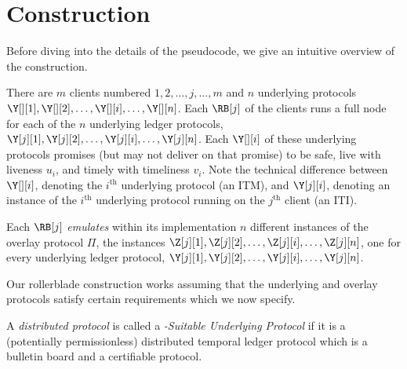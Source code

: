 \section{Construction}\label{sec:construction}

Before diving into the details of the pseudocode, we give an intuitive overview
of the \rollerblade construction.


There are $m$ \rollerblade clients numbered $1, 2,\allowbreak \ldots,\allowbreak j,\allowbreak \ldots,\allowbreak m$
and $n$ underlying protocols $\Y[][1], \Y[][2],\allowbreak \ldots,\allowbreak \Y[][i],\allowbreak \ldots,\allowbreak \Y[][n]$.
Each $\RB[j]$ of the clients runs a full node for each of the $n$ underlying
ledger protocols,
$\Y[j][1], \allowbreak \Y[j][2], \ldots,\allowbreak \Y[j][i],\allowbreak \ldots,\allowbreak \Y[j][n]$.
Each $\Y[][i]$ of these underlying protocols promises (but may not deliver on that promise)
to be safe, live with liveness $u_i$, and timely with timeliness $v_i$.
Note the technical difference between $\Y[][i]$, denoting the $i^\text{th}$ underlying protocol (an ITM),
and $\Y[j][i]$, denoting an instance of the $i^\text{th}$ underlying protocol running on the
$j^\text{th}$ client (an ITI).

Each $\RB[j]$ \emph{emulates} within its implementation $n$ different instances
of the overlay protocol $\Pi$, the instances
$\Z[j][1], \Z[j][2],\allowbreak \ldots,\allowbreak \Z[j][i],\allowbreak \ldots,\allowbreak \Z[j][n]$,
one for every underlying ledger protocol,
$\Y[j][1], \Y[j][2],\allowbreak \ldots,\allowbreak \Y[j][i],\allowbreak \ldots,\allowbreak \Y[j][n]$.

Our rollerblade construction works assuming that the underlying and overlay protocols satisfy
certain requirements which we now specify.

\begin{definition}
  A \emph{distributed protocol} is called a \emph{\rollerblade-Suitable
  Underlying Protocol} if it is a
  (potentially permissionless)
  distributed temporal ledger protocol
  which is a bulletin board and a
  certifiable protocol.
\end{definition}

